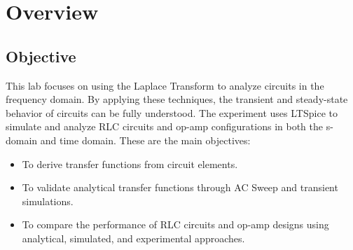\chapter{Overview}

\section{Objective}
This lab focuses on using the Laplace Transform to analyze circuits in the frequency domain. By applying these techniques, the transient and steady-state behavior of circuits can be fully understood. The experiment uses LTSpice to simulate and analyze RLC circuits and op-amp configurations in both the s-domain and time domain. These are the main objectives:

\begin{itemize}
    \item To derive transfer functions from circuit elements.
    \item To validate analytical transfer functions through AC Sweep and transient simulations.
    \item To compare the performance of RLC circuits and op-amp designs using analytical, simulated, and experimental approaches.
\end{itemize}
